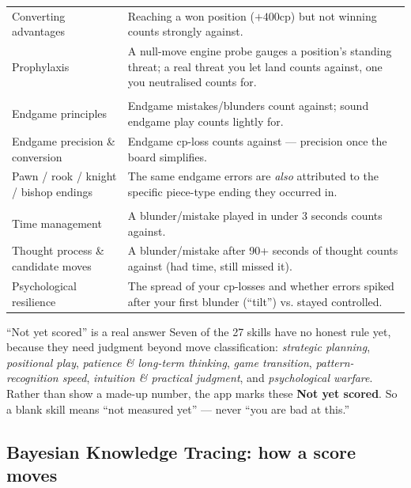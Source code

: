 \documentclass[11pt]{article}
\begin{document}
\begin{center}
\begin{xltabular}{\linewidth}{@{}l Y@{}}
Converting advantages & Reaching a won position ($+400$cp) but not winning counts strongly against. \\
Prophylaxis & A null-move engine probe gauges a position's standing threat; a real threat you let land counts against, one you neutralised counts for. \\
\addlinespace
{}\\
Endgame principles & Endgame mistakes/blunders count against; sound endgame play counts lightly for. \\
Endgame precision \& conversion & Endgame cp-loss counts against --- precision once the board simplifies. \\
Pawn / rook / knight / bishop endings & The same endgame errors are \emph{also} attributed to the specific piece-type ending they occurred in. \\
\addlinespace
{}\\
Time management & A blunder/mistake played in under 3 seconds counts against. \\
Thought process \& candidate moves & A blunder/mistake after 90+ seconds of thought counts against (had time, still missed it). \\
Psychological resilience & The spread of your cp-losses and whether errors spiked after your first blunder (``tilt'') vs. stayed controlled. \\
\bottomrule
\end{xltabular}
\end{center}

\begin{rulebox}{``Not yet scored'' is a real answer}
Seven of the 27 skills have no honest rule yet, because they need judgment
beyond move classification: \emph{strategic planning}, \emph{positional play},
\emph{patience \& long-term thinking}, \emph{game transition}, \emph{pattern-
recognition speed}, \emph{intuition \& practical judgment}, and \emph{psychological
warfare}. Rather than show a made-up number, the app marks these \textbf{Not yet
scored}. So a blank skill means ``not measured yet'' --- never ``you are bad at
this.''
\end{rulebox}

\subsection{Bayesian Knowledge Tracing: how a score moves}
\end{document}
